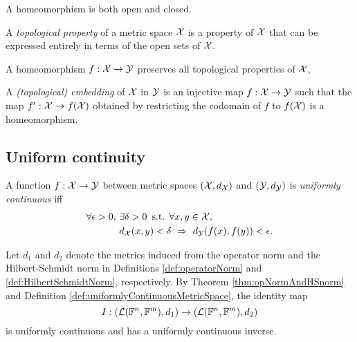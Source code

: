 \begin{lem}
  \label{lem:homeomorphismIsOpenAndClosed}
  A homeomorphism is both open and closed.
\end{lem}

\begin{defn}
  \label{def:topologicalProperty}
  A \emph{topological property} of a metric space ${\cal X}$
  is a property of ${\cal X}$
  that can be expressed entirely in terms of
  the open sets of ${\cal X}$.
\end{defn}

\begin{coro}
  A homeomorphism $f:{\cal X}\rightarrow {\cal Y}$
  preserves all topological properties of ${\cal X}$,
\end{coro}

\begin{defn}
  A \emph{(topological) embedding} of ${\cal X}$ in ${\cal Y}$
  is an injective map $f:{\cal X}\rightarrow{\cal Y}$
  such that the map $f':{\cal X}\rightarrow f({\cal X})$
  obtained by restricting the codomain of $f$ to $f({\cal X})$
  is a homeomorphism.
\end{defn}

\subsection{Uniform continuity}

\begin{defn}
  \label{def:uniformlyContinuousMetricSpace}
  A function $f: {\cal X} \rightarrow {\cal Y}$ between
  metric spaces $({\cal X},d_{\cal X})$ and $({\cal Y}, d_{\cal Y})$ 
  is \emph{uniformly continuous}
  iff
  \begin{align}
    \label{eq:uniformlyContinuousMetricSpace}
    \forall \epsilon>0,\
    & \exists \delta>0\, \text{ s.t. }
      \forall x,y \in {\cal X},\ \
    \\ \nonumber
    &d_{\cal X}(x,y)<\delta\ \Rightarrow\ d_{\cal Y}(f(x),f(y))<\epsilon.
  \end{align}
\end{defn}

\begin{exm}
  \label{exm:identityUniformlyCont}
  Let $d_1$ and $d_2$ denote the metrics
  induced from the operator norm and the Hilbert-Schmidt norm
  in Definitions \ref{def:operatorNorm} and
  \ref{def:HilbertSchmidtNorm}, respectively.
  By Theorem \ref{thm:opNormAndHSnorm}
  and Definition \ref{def:uniformlyContinuousMetricSpace}, 
  the identity map
  \begin{equation}
    \label{eq:identityUniformlyCont}
    I: \left({\cal L}(\mathbb{F}^n,\mathbb{F}^m), d_1\right)
    \rightarrow
    \left({\cal L}(\mathbb{F}^n,\mathbb{F}^m), d_2\right)
  \end{equation}
  is uniformly continuous and has a uniformly continuous inverse.
\end{exm}

